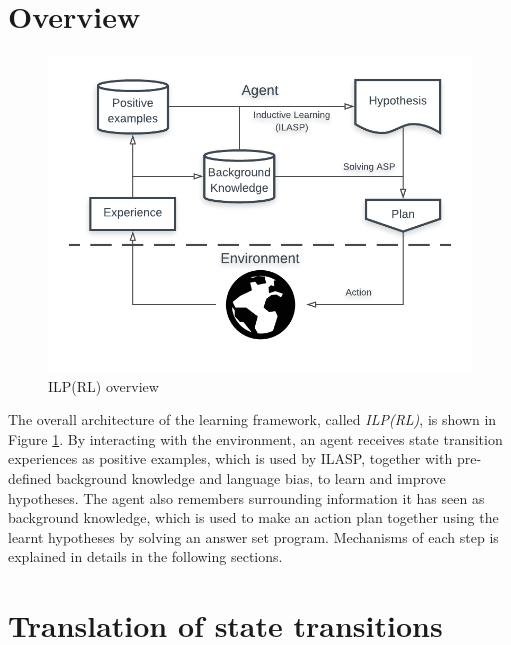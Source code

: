 \section{Overview}
\label{sec:overview}

\begin{figure}[!htb]
\centering
\includegraphics[width=1.0\textwidth]{./figures/architecture}
\caption{ILP(RL) overview}
\label{fig:ILPRL_overview}
\end{figure}

The overall architecture of the learning framework, called \textit{ILP(RL)}, is shown in Figure \ref{fig:ILPRL_overview}. 
By interacting with the environment, an agent receives state transition experiences as positive examples, which is used by ILASP, together with pre-defined background knowledge and language bias, to learn and improve hypotheses.
The agent also remembers surrounding information it has seen as background knowledge, which is used to make an action plan together using the learnt hypotheses by solving an answer set program.
Mechanisms of each step is explained in details in the following sections.

\section{Translation of state transitions}
\label{sec:translation_state_transitions}

